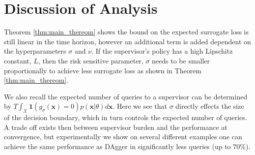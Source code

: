 \documentclass[10pt, conference]{ieeeconf}      %
\newcommand{\bx}{\mathbf{x}}
\begin{document}
\section{Discussion of Analysis}
Theorem \ref{thm:main_thereom} shows the bound on the expected surrogate loss is still linear in the time horizon, however an additional term is added dependent on the hyperparameters $\sigma$ and $\nu$. If the supervisor's policy has a high Lipschitz constant, $L$, then the risk sensitive parameter, $\sigma$ needs to be smaller proportionally to achieve less surrogate loss as shown in Theorem \ref{thm:main_thereom}. 

We also recall the expected number of queries to a supervisor can be determined  by $T\int_\mathcal{X} \mathbf{1}(g_{\sigma}(\bx) = 0) p(\bx|\theta)d\bx$. Here we see that $\sigma$ directly effects the size of the decision boundary, which in turn controls the expected number of queries. A trade off exists then between supervisor burden and the performance at convergence, but experimentally we show on several different examples one can achieve the same performance as DAgger in significantly less queries (up to $70\%$). 



  


\end{document}
